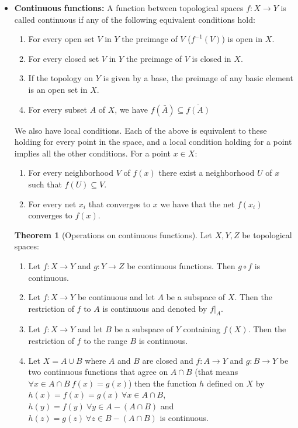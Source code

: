 \documentclass[a4paper]{book}
\theoremstyle{definition}
\newtheorem{theorem}{Theorem}[section]
\theoremstyle{ejemplo}
\theoremstyle{demostracion}
\begin{document}
\begin{itemize}
\item
\textbf{Continuous functions: }A function between topological spaces $f:X\rightarrow Y$ is called continuous if any of the following equivalent conditions hold:
\begin{enumerate}
\item
For every open set $V$ in $Y$ the preimage of $V$ ($f^{-1}(V)$) is open in $X$.
\item
For every closed set $V$ in $Y$ the preimage of $V$ is closed in $X$.
\item
If the topology on $Y$ is given by a base, the preimage of any basic element is an open set in $X$.
\item
For every subset $A$ of $X$, we have $f(\bar{A})\subseteq \overline{f(A)}$
\end{enumerate}
We also have local conditions. Each of the above is equivalent to these holding for every point in the space, and a local condition holding for a point implies all the other conditions. For a point $x\in X$:
\begin{enumerate}
\item
For every neighborhood $V$ of $f(x)$ there exist a neighborhood $U$ of $x$ such that $f(U)\subseteq V$.
\item
For every net $x_{i}$ that converges to $x$ we have that the net $f(x_{i})$ converges to $f(x)$.
\end{enumerate}

\begin{theorem}[Operations on continuous functions]
Let $X,Y,Z$ be topological spaces:
\begin{enumerate}
\item
Let $f:X\rightarrow Y$ and $g:Y\rightarrow Z$ be continuous functions. Then $g\circ f$ is continuous.
\item
Let $f:X\rightarrow Y$ be continuous and let $A$ be a subspace of $X$. Then the restriction of $f$ to $A$ is continuous and denoted by $f|_{A}$.
\item
Let $f:X\rightarrow Y$ and let $B$ be a subspace of $Y$ containing $f(X)$. Then the restriction of $f$ to the range $B$ is continuous.
\item
Let $X=A\cup B$ where $A$ and $B$ are closed and $f:A\rightarrow Y$ and $g:B\rightarrow Y$ be two continuous functions that agree on $A\cap B$ (that means $\forall x \in A\cap B\ f(x)=g(x)$) then the function $h$ defined on $X$ by $h(x)=f(x)=g(x)\ \forall x \in A\cap B$, $h(y)=f(y)\ \forall y \in A-(A\cap B)$ and $h(z)=g(z)\ \forall z \in B-(A\cap B)$ is continuous.
\end{enumerate}
\end{theorem}


\end{itemize}
\end{document}
